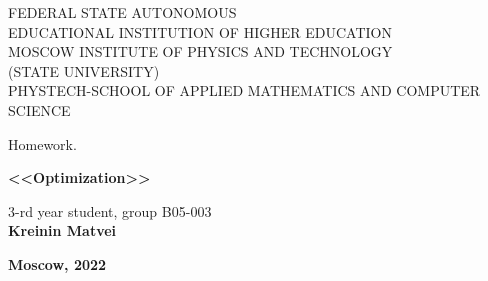 \begin{center}
	\hfill \break
	\hfill \break	
	FEDERAL STATE AUTONOMOUS \\
    EDUCATIONAL INSTITUTION OF HIGHER EDUCATION \\
    MOSCOW INSTITUTE OF PHYSICS AND TECHNOLOGY \\
    (STATE UNIVERSITY) \\
    PHYSTECH-SCHOOL OF APPLIED MATHEMATICS AND COMPUTER SCIENCE\\

	\hfill \break

	Homework.
	
	\vspace{7em}
	
	\vspace{7em}
	\large{\textbf{<<Optimization>>}}\\

\end{center}

\vspace{13em}

\begin{flushright}
	\normalsize{3-rd year student, group B05-003}\\
	\normalsize{\textbf{Kreinin Matvei}}\\
\end{flushright}


\begin{center}
	\normalsize{\textbf{Moscow, 2022}}
\end{center}


\thispagestyle{empty}
\setcounter{page}{0}

